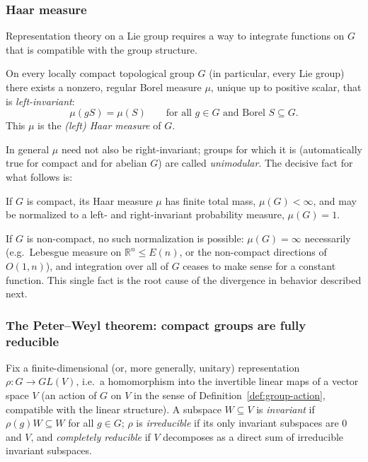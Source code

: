 \documentclass[mathematics,review,submit,moreauthors]{Definitions/mdpi}
\begin{document}
\subsubsection{Haar measure}
\label{subsubsec:haar-measure}

Representation theory on a Lie group requires a way to integrate functions
on $G$ that is compatible with the group structure.

\begin{Theorem}
\label{thm:haar-measure}
On every locally compact topological group $G$ (in particular, every Lie
group) there exists a nonzero, regular Borel measure $\mu$, unique up to
positive scalar, that is \emph{left-invariant}:
\[
    \mu(gS) = \mu(S) \qquad \text{for all } g \in G \text{ and Borel } S \subseteq G.
\]
This $\mu$ is the \emph{(left) Haar measure} of $G$.
\end{Theorem}

In general $\mu$ need not also be right-invariant; groups for which it is
(automatically true for compact and for abelian $G$) are called
\emph{unimodular}. The decisive fact for what follows is:

\begin{Proposition}
\label{prop:compact-haar-finite}
If $G$ is compact, its Haar measure $\mu$ has finite total mass,
$\mu(G) < \infty$, and may be normalized to a left- and right-invariant
probability measure, $\mu(G) = 1$.
\end{Proposition}

If $G$ is non-compact, no such normalization is possible: $\mu(G) = \infty$
necessarily (e.g.\ Lebesgue measure on $\mathbb{R}^n \leq E(n)$, or the
non-compact directions of $O(1,n)$), and integration over all of $G$ ceases
to make sense for a constant function. This single fact is the root cause of
the divergence in behavior described next.

\subsubsection{The Peter--Weyl theorem: compact groups are fully reducible}
\label{subsubsec:peter-weyl}

Fix a finite-dimensional (or, more generally, unitary) representation
$\rho : G \to GL(V)$, i.e.\ a homomorphism into the invertible linear maps of
a vector space $V$ (an action of $G$ on $V$ in the sense of
Definition~\ref{def:group-action}, compatible with the linear structure). A
subspace $W \subseteq V$ is \emph{invariant} if $\rho(g)W \subseteq W$ for
all $g \in G$; $\rho$ is \emph{irreducible} if its only invariant subspaces
are $0$ and $V$, and \emph{completely reducible} if $V$ decomposes as a
direct sum of irreducible invariant subspaces.
\end{document}
